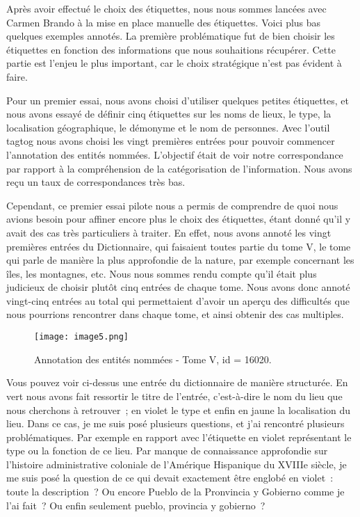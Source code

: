 \documentclass[a4paper,12pt,twoside]{book}
\begin{document}
Après avoir effectué le choix des étiquettes, nous nous sommes lancées avec Carmen Brando à la mise en place manuelle des étiquettes. Voici plus bas quelques exemples annotés. La première problématique fut de bien choisir les étiquettes en fonction des informations que nous souhaitions récupérer. Cette partie est l’enjeu le plus important, car le choix stratégique n’est pas évident à faire.

Pour un premier essai, nous avons choisi d’utiliser quelques petites étiquettes, et nous avons essayé de définir cinq étiquettes sur les noms de lieux, le type, la localisation géographique, le démonyme et le nom de personnes. Avec l’outil tagtog nous avons choisi les vingt premières entrées pour pouvoir commencer l’annotation des entités nommées. L’objectif était de voir notre correspondance par rapport à la compréhension de la catégorisation de l’information. Nous avons reçu un taux de correspondances très bas.

Cependant, ce premier essai pilote nous a permis de comprendre de quoi nous avions besoin pour affiner encore plus le choix des étiquettes, étant donné qu’il y avait des cas très particuliers à traiter. En effet, nous avons annoté les vingt premières entrées du Dictionnaire, qui faisaient toutes partie du tome V, le tome qui parle de manière la plus approfondie de la nature, par exemple concernant les îles, les montagnes, etc. Nous nous sommes rendu compte qu’il était plus judicieux de choisir plutôt cinq entrées de chaque tome. Nous avons donc annoté vingt-cinq entrées au total qui permettaient d’avoir un aperçu des difficultés que nous pourrions rencontrer dans chaque tome, et ainsi obtenir des cas multiples. 
	
	
\begin{figure}[!h]
    \centering
    \texttt{[image: image5.png]}
    \caption{Annotation des entités nommées - Tome V, id = 16020.}
    \label{septFig}
\end{figure}


Vous pouvez voir ci-dessus une entrée du dictionnaire de manière structurée. En vert nous avons fait ressortir le titre de l’entrée, c’est-à-dire le nom du lieu que nous cherchons à retrouver ; en violet le type et enfin en jaune la localisation du lieu. Dans ce cas, je me suis posé plusieurs questions, et j’ai rencontré plusieurs problématiques. Par exemple en rapport avec l’étiquette en violet représentant le type ou la fonction de ce lieu. Par manque de connaissance approfondie sur l’histoire administrative coloniale de l’Amérique Hispanique du XVIIIe siècle, je me suis posé la question de ce qui devait exactement être englobé en violet : toute la description ? Ou encore Pueblo de la Pronvincia y Gobierno comme je l’ai fait ? Ou enfin seulement pueblo, provincia y gobierno ?
\end{document}
